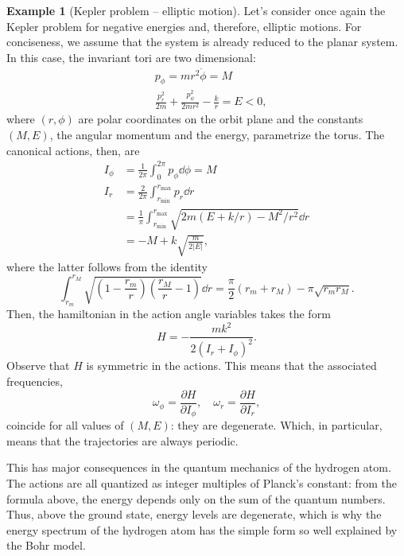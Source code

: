\documentclass[english,fontsize=11pt,paper=b5]{scrbook}
\numberwithin{equation}{chapter}
\theoremstyle{definition}
\newtheorem{example}{Example}[chapter]
\begin{document}
      \begin{example}[Kepler problem -- elliptic motion]
        Let's consider once again the Kepler problem for negative energies and, therefore, elliptic motions.
        For conciseness, we assume that the system is already reduced to the planar system. In this case, the invariant tori are two dimensional:
        \begin{align}
     & p_\phi = m r^2 \dot \phi = M                                       \\
     & \frac{p_r^2}{2 m} + \frac{p_\phi^2}{2 m r^2} - \frac{k}{r} = E <0,
        \end{align}
        where $(r,\phi)$ are polar coordinates on the orbit plane and the constants $(M,E)$, the angular momentum and the energy, parametrize the torus.
        The canonical actions, then, are
        \begin{align}
          I_\phi & = \frac{1}{2\pi} \int_0^{2\pi} p_\phi \dd \phi = M                                       \\
          I_r    & = \frac{2}{2\pi} \int_{r_{\mathrm{min}}}^{r_{\mathrm{max}}} p_r \dd r                    \\
                 & = \frac1\pi \int_{r_{\mathrm{min}}}^{r_{\mathrm{max}}} \sqrt{2m(E + k/r) - M^2/r^2}\dd r \\
                 & = - M + k \sqrt{\frac{m}{2|E|}},
        \end{align}
        where the latter follows from the identity
        \begin{equation}
          \int_{r_{m}}^{r_{M}} \sqrt{\left(1-\frac{r_m}r\right)\left(\frac{r_M}r-1\right)}\dd r = \frac{\pi}2(r_m + r_M) - \pi \sqrt{r_m r_M}.
        \end{equation}
        Then, the hamiltonian in the action angle variables takes the form
        \begin{equation}
          H = - \frac{mk^2}{2(I_r + I_\phi)^2}.
        \end{equation}
        Observe that $H$ is symmetric in the actions. This means that the associated frequencies,
        \begin{equation}
          \omega_\phi = \frac{\partial H}{\partial I_\phi}, \quad
          \omega_r = \frac{\partial H}{\partial I_r},
        \end{equation}
        coincide for all values of $(M,E)$: they are degenerate. Which, in particular, means that the trajectories are always periodic.

        This has major consequences in the quantum mechanics of the hydrogen atom. The actions are all quantized as integer multiples of Planck's constant: from the formula above, the energy depends only on the sum of the quantum numbers. Thus, above the ground state, energy levels are degenerate, which is why the energy spectrum of the hydrogen atom has the simple form so well explained by the Bohr model.


\end{example}
\end{document}
